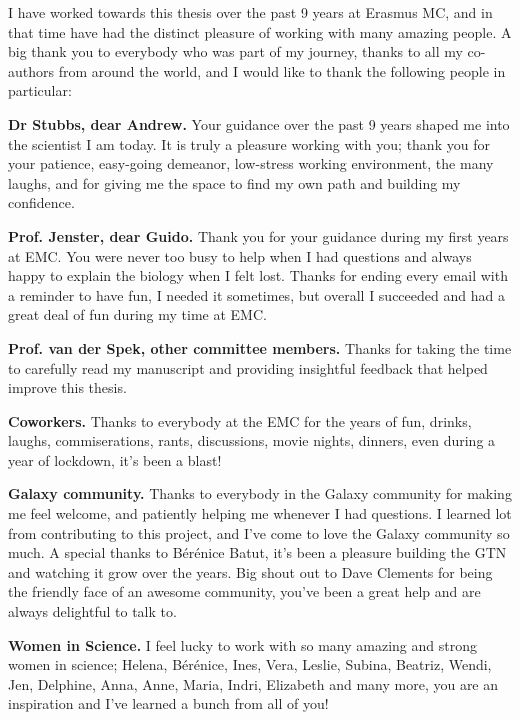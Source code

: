 
 I have worked towards this thesis over the past 9 years at Erasmus MC, and in that time have had the distinct pleasure of working with many amazing people. A big thank you to everybody who was part of my journey, thanks to all my co-authors from around the world, and I would like to thank the following people in particular:

\textbf{Dr Stubbs, dear Andrew.} Your guidance over the past 9 years shaped me into the scientist I am today. It is truly a pleasure working with you; thank you for your patience, easy-going demeanor, low-stress working environment, the many laughs, and for giving me the space to find my own path and building my confidence.

\textbf{Prof. Jenster, dear Guido.} Thank you for your guidance during my first years at EMC. You were never too busy to help when I had questions and always happy to explain the biology when I felt lost. Thanks for ending every email with a reminder to have fun, I needed it sometimes, but overall I succeeded and had a great deal of fun during my time at EMC.


\textbf{Prof. van der Spek, other committee members.} Thanks for taking the time to carefully read my manuscript and providing insightful feedback that helped improve this thesis.

\textbf{Coworkers.} Thanks to everybody at the EMC for the years of fun, drinks, laughs, commiserations, rants, discussions, movie nights, dinners, even during a year of lockdown, it's been a blast!

\textbf{Galaxy community.} Thanks to everybody in the Galaxy community for making me feel welcome, and patiently helping me whenever I had questions. I learned lot from contributing to this project, and I've come to love the Galaxy community so much. A special thanks to Bérénice Batut, it's been a pleasure building the GTN and watching it grow over the years. Big shout out to Dave Clements for being the friendly face of an awesome community, you've been a great help and are always delightful to talk to.

\textbf{Women in Science.} I feel lucky to work with so many amazing and strong women in science; Helena, Bérénice, Ines, Vera, Leslie, Subina, Beatriz, Wendi, Jen, Delphine, Anna, Anne, Maria, Indri, Elizabeth and many more, you are an inspiration and I've learned a bunch from all of you!

